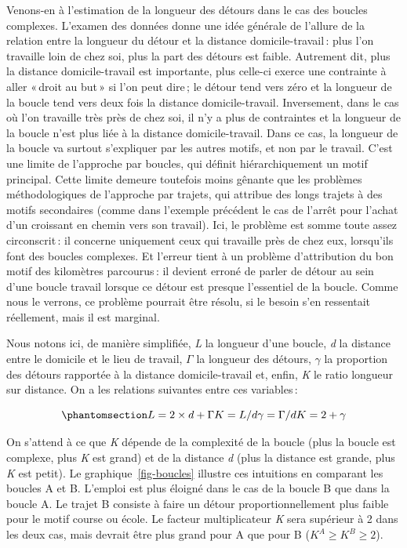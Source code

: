 \documentclass[
  9pt,
  a4paper,
  DIV=11]{scrreprt}
\begin{document}
Venons-en à l'estimation de la longueur des détours dans le cas des
boucles complexes. L'examen des données donne une idée générale de
l'allure de la relation entre la longueur du détour et la distance
domicile-travail\,: plus l'on travaille loin de chez soi, plus la part
des détours est faible. Autrement dit, plus la distance domicile-travail
est importante, plus celle-ci exerce une contrainte à aller «\,droit au
but\,» si l'on peut dire\,; le détour tend vers zéro et la longueur de
la boucle tend vers deux fois la distance domicile-travail. Inversement,
dans le cas où l'on travaille très près de chez soi, il n'y a plus de
contraintes et la longueur de la boucle n'est plus liée à la distance
domicile-travail. Dans ce cas, la longueur de la boucle va surtout
s'expliquer par les autres motifs, et non par le travail. C'est une
limite de l'approche par boucles, qui définit hiérarchiquement un motif
principal. Cette limite demeure toutefois moins gênante que les
problèmes méthodologiques de l'approche par trajets, qui attribue des
longs trajets à des motifs secondaires (comme dans l'exemple précédent
le cas de l'arrêt pour l'achat d'un croissant en chemin vers son
travail). Ici, le problème est somme toute assez circonscrit\,: il
concerne uniquement ceux qui travaille près de chez eux, lorsqu'ils font
des boucles complexes. Et l'erreur tient à un problème d'attribution du
bon motif des kilomètres parcourus\,: il devient erroné de parler de
détour au sein d'une boucle travail lorsque ce détour est presque
l'essentiel de la boucle. Comme nous le verrons, ce problème pourrait
être résolu, si le besoin s'en ressentait réellement, mais il est
marginal.

Nous notons ici, de manière simplifiée, \emph{L} la longueur d'une
boucle, \emph{d} la distance entre le domicile et le lieu de travail,
\(\Gamma\) la longueur des détours, \(\gamma\) la proportion des détours
rapportée à la distance domicile-travail et, enfin, \emph{K} le ratio
longueur sur distance. On a les relations suivantes entre ces
variables\,:

\begin{equation}\phantomsection\label{eq-relations-k}{
L = 2 \times d + \Gamma
\\
K = L / d
\\
\gamma = \Gamma / d
\\
K = 2 + \gamma
}\end{equation}

On s'attend à ce que \emph{K} dépende de la complexité de la boucle
(plus la boucle est complexe, plus \emph{K} est grand) et de la distance
\emph{d} (plus la distance est grande, plus \emph{K} est petit). Le
graphique~\ref{fig-boucles} illustre ces intuitions en comparant les
boucles A et B. L'emploi est plus éloigné dans le cas de la boucle B que
dans la boucle A. Le trajet B consiste à faire un détour
proportionnellement plus faible pour le motif course ou école. Le
facteur multiplicateur \emph{K} sera supérieur à 2 dans les deux cas,
mais devrait être plus grand pour A que pour B
(\(K^A \geq K^B \geq 2\)).
\end{document}

